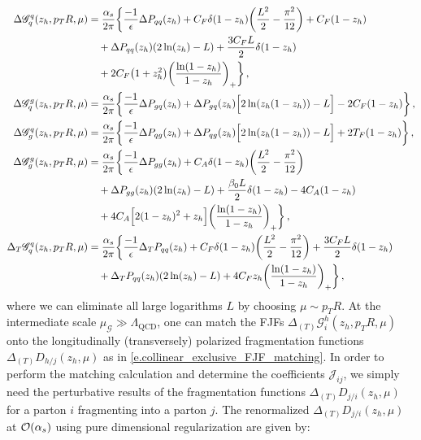 \documentclass[a4paper, 11 pt]{article}
\newcommand{\nnu}{\nonumber\\}
\begin{document}
\begin{align}
\Delta \mathscr{G}_q^q (z_h, p_TR, \mu)
& =
\frac{\alpha _s}{2 \pi} \bigg\{\frac{-1}{\epsilon} \Delta P_{qq}(z_h) + C_F \delta (1-z_h) \pqty{\frac{L^2}{2}-\frac{\pi ^2}{12}} + C_F (1-z_h) \nnu
& \quad + \Delta P_{qq}(z_h)(2\ln(z_h) - L) + \frac{3 C_F L}{2} \delta \pqty{1 - z_h} \nonumber \\
& \quad + 2 C_F \pqty{1 + z_h^2} \pqty{\frac{\ln(1-z_h)}{1-z_h}}_+ \bigg\} \,, \\
\Delta \mathscr{G}_{q}^g (z_h, p_TR, \mu)
& =
\frac{\alpha _s}{2 \pi} \bigg\{\frac{-1}{\epsilon} \Delta P_{gq}(z_h)+\Delta P_{gq}(z_h) \Big[2\ln(z_h(1-z_h)) - L\Big]- 2 C_F (1-z_h) \bigg\} \,, \\
\Delta \mathscr{G}_g^q (z_h, p_TR, \mu)
& =
\frac{\alpha _s}{2 \pi} \bigg\{\frac{-1}{\epsilon} \Delta{P}_{q g}(z_h)+\Delta P_{qg}(z_h)\Big[2\ln(z_h(1-z_h)) - L\Big] + 2 T_F (1-z_h) \bigg\} \,, \\
\Delta \mathscr{G}_g^g (z_h, p_TR, \mu)
& =
\frac{\alpha _s}{2 \pi} \bigg\{\frac{-1}{\epsilon} \Delta P_{gg}(z_h) + C_A \delta (1-z_h) \pqty{\frac{L^2}{2}-\frac{\pi^2}{12}} \nnu
& \quad + \Delta P_{gg}(z_h)(2\ln(z_h) - L) + \frac{\beta _0 L}{2} \delta \pqty{1 - z_h} - 4 C_A (1-z_h) \nnu
& \quad + 4 C_A \Big[2(1-z_h)^2+z_h\Big] \pqty{\frac{\ln (1-z_h)}{1-z_h}}_+ \bigg\} \,, \\
\Delta _T \mathscr{G}_q^q (z_h, p_TR, \mu)
& =
\frac{\alpha _s}{2 \pi} \bigg\{\frac{-1}{\epsilon} \Delta _T P_{qq}(z_h) + C_F \delta (1-z_h) \pqty{\frac{L^2}{2}-\frac{\pi^2}{12}} + \frac{3 C_F L}{2} \delta \pqty{1 - z_h} \nnu
& \quad + \Delta _T P_{qq}(z_h)(2\ln(z_h) - L) + 4 C_F z_h \pqty{\frac{\ln (1-z_h)}{1-z_h}}_+ \bigg\}\, ,
\end{align}
\endgroup
where we can eliminate all large logarithms $L$ by choosing $\mu \sim p_T R$.
At the intermediate scale $\mu_{\mathscr{G}} \gg \Lambda_{\mathrm{QCD}}$, one can match the FJFs $\Delta_{(T)}\mathscr{G}_i^h(z_h, p_TR, \mu)$ onto the longitudinally (transversely) polarized fragmentation functions $\Delta_{(T)}D_{h/j}(z_h, \mu)$ as in \cref{e.collinear_exclusive_FJF_matching}.
In order to perform the matching calculation and determine the coefficients $\mathscr{J}_{i j}$, we simply need the perturbative results of the fragmentation functions $\Delta_{(T)} D_{j/i}(z_h, \mu)$ for a parton $i$ fragmenting into a parton $j$.
The renormalized $\Delta_{(T)}D_{j/i}(z_h, \mu)$ at $\order{\alpha _s}$ using pure dimensional regularization are given by:
\end{document}
